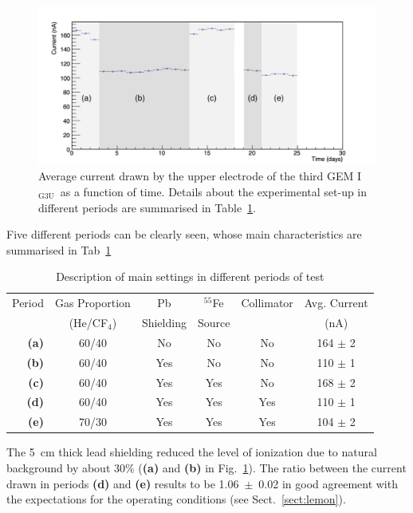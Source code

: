 \documentclass[a4paper,11pt]{article}
\newcommand{\Ig}  {I$_{\mathrm{G3U}}$}
\begin{document}
\begin{figure}[ht]
	\centering
	\includegraphics[width=0.79\linewidth]{Figures/c2_periods.png} 
  	\caption{Average current drawn by the upper electrode of the third GEM \Ig\ as a function of time. Details about the experimental set-up in different periods are summarised in Table~\ref{tab:period}.}
  	\label{fig:period}
\end{figure}

Five different periods can be clearly seen, whose main characteristics are summarised in Tab~\ref{tab:period}
\begin{table}[h!]
\caption{Description of main settings in different periods of test}
\begin{center}
\begin{tabular}{ |r|c|c|c|c|c| } 
 \hline
 Period & Gas Proportion & Pb        & $^{55}$Fe & Collimator & Avg. Current\\ 
        & (He/CF$_4$)    & Shielding & Source    &            & (nA)\\ 
 \hline
 \hline
 {\bf (a)} & 60/40 & No & No & No  & 164 $\pm$ 2\\
 {\bf (b)} & 60/40 & Yes & No & No & 110 $\pm$ 1\\
 {\bf (c)} & 60/40 & Yes & Yes & No & 168 $\pm$ 2 \\
 {\bf (d)} & 60/40 & Yes & Yes & Yes & 110 $\pm$ 1\\
 {\bf (e)} & 70/30 & Yes & Yes & Yes & 104 $\pm$ 2\\
 \hline
\end{tabular}
\end{center}
\label{tab:period}
\end{table}

The 5~cm thick lead shielding reduced the level of ionization due to natural background by about 30\% ({\bf (a)} and {\bf (b)} in Fig.~\ref{fig:period}). 
The ratio between the current drawn in periods {\bf (d)} and {\bf (e)} results to be 1.06~$\pm$~0.02 in good agreement with the expectations for the operating conditions (see Sect.~\ref{sect:lemon}).
\end{document}
